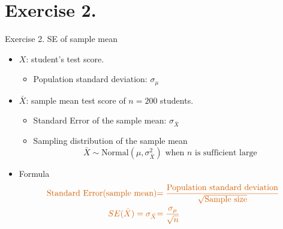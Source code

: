 \documentclass[
  10pt,
  ignorenonframetext,
]{beamer}
\providecommand{\tightlist}{%
  \setlength{\itemsep}{0pt}\setlength{\parskip}{0pt}}
\begin{document}
\hypertarget{exercise-2.}{%
\section{Exercise 2.}\label{exercise-2.}}

\begin{frame}{Exercise 2. SE of sample mean}
\protect\hypertarget{exercise-2.-se-of-sample-mean}{}
\begin{itemize}
\tightlist
\item
  \(X\): student's test score.

  \begin{itemize}
  \tightlist
  \item
    Population standard deviation: \(\sigma_\mu\)
  \end{itemize}
\end{itemize}

\vspace{2mm}

\begin{itemize}
\tightlist
\item
  \(\bar{X}\): sample mean test score of \(n = 200\) students.

  \begin{itemize}
  \tightlist
  \item
    Standard Error of the sample mean: \(\sigma_{\bar{X}}\) \vspace{1mm}
  \item
    Sampling distribution of the sample mean \[
    \bar{X} \sim \text{Normal}(\mu,\sigma_{\bar{X}}^2) \text{ when } n \text{ is sufficient large} 
    \]
  \end{itemize}
\end{itemize}

\vspace{2mm}

\begin{itemize}
\tightlist
\item
  Formula \[
  \begin{aligned}
  \color{red}{\text{Standard Error}(\text{sample mean})} &\color{red}{=\frac{\text{Population standard deviation}}{\sqrt{\text{Sample size}}}}\\
  \color{red}{SE(\bar{X}) = \sigma_{\bar{X}}} &\color{red}{= \frac{\sigma_\mu}{\sqrt{n}}}
  \end{aligned}
  \]
\end{itemize}
\end{frame}
\end{document}
